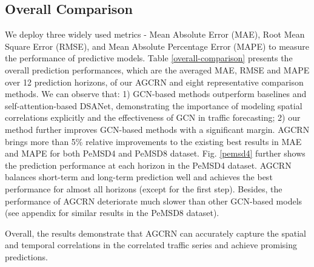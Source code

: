 \documentclass{article}
\begin{document}
\subsection{Overall Comparison}
We deploy three widely used metrics - Mean Absolute Error (MAE), Root Mean Square Error (RMSE), and Mean Absolute Percentage Error (MAPE) to measure the performance of predictive models. Table \ref{overall-comparison} presents the overall prediction performances, which are the averaged MAE, RMSE and MAPE over 12 prediction horizons, of our AGCRN and eight representative comparison methods.  We can observe that: 1) GCN-based methods outperform baselines and self-attention-based DSANet, demonstrating the importance of modeling spatial correlations explicitly and the effectiveness of GCN in traffic forecasting; 2) our method further improves GCN-based methods with a significant margin. AGCRN brings more than 5\% relative improvements to the existing best results in MAE and MAPE for both PeMSD4 and PeMSD8 dataset. Fig. \ref{pemsd4} further shows the prediction performance at each horizon in the PeMSD4 dataset. AGCRN balances short-term and long-term prediction well and achieves the best performance for almost all horizons (except for the first step). Besides, the performance of AGCRN deteriorate much slower than other GCN-based models (see appendix for similar results in the PeMSD8 dataset). 

Overall, the results demonstrate that AGCRN can accurately capture the spatial and temporal correlations in the correlated traffic series and achieve promising predictions.
\end{document}
